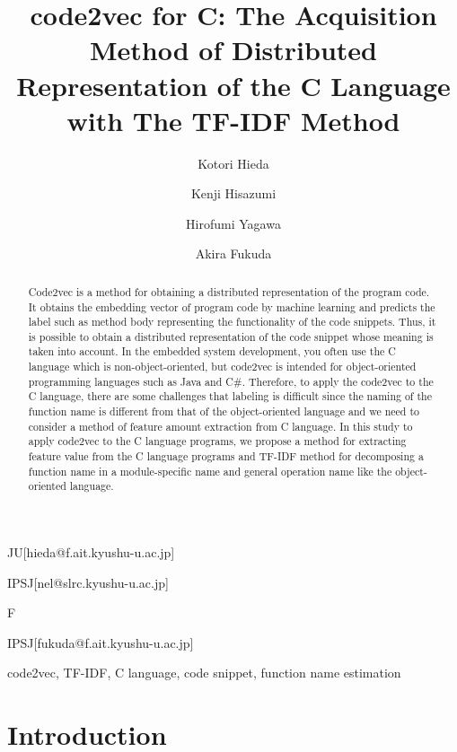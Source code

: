 \documentclass[english,preprint,JIP]{ipsj}
\begin{document}
\title{code2vec for C: The Acquisition Method of Distributed Representation of the C Language with The TF-IDF Method}




\author{Kotori Hieda}{JU}[hieda@f.ait.kyushu-u.ac.jp]
\author{Kenji Hisazumi}{IPSJ}[nel@slrc.kyushu-u.ac.jp]
\author{Hirofumi Yagawa}{F}
\author{Akira Fukuda}{IPSJ}[fukuda@f.ait.kyushu-u.ac.jp]


\begin{abstract}
Code2vec is a method for obtaining a distributed representation of the program code. It obtains the embedding vector of program code by machine learning and predicts the label such as method body representing the functionality of the code snippets. Thus, it is possible to obtain a distributed representation of the code snippet whose meaning is taken into account. In the embedded system development, you often use the C language which is non-object-oriented, but code2vec is intended for object-oriented programming languages ​​such as Java and C#. Therefore, to apply the code2vec to the C language,  there are some challenges that labeling is difficult since the naming of the function name is different from that of the object-oriented language and we need to consider a method of feature amount extraction from C language. In this study to apply code2vec to the C language programs, we propose a method for extracting feature value from the C language programs and TF-IDF method for decomposing a function name in a module-specific name and general operation name like the object-oriented language.
\end{abstract}

\begin{keyword}
code2vec, TF-IDF, C language, code snippet, function name estimation
\end{keyword}

\maketitle

\section{Introduction}



\section{}



%


\end{document}
